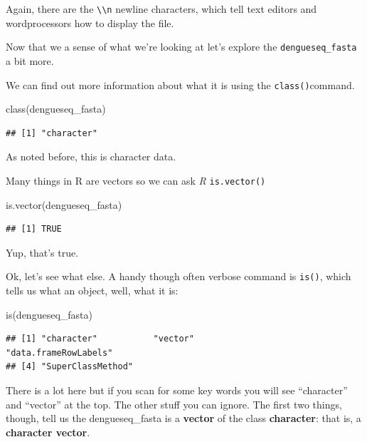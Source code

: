 \documentclass[
]{book}
\newenvironment{Shaded}{\begin{snugshade}}{\end{snugshade}}
\newcommand{\FunctionTok}[1]{\textcolor[rgb]{0.00,0.00,0.00}{#1}}
\newcommand{\NormalTok}[1]{#1}
\begin{document}
Again, there are the \texttt{\textbackslash{}\textbackslash{}n} newline characters, which tell text editors and wordprocessors how to display the file.

Now that we a sense of what we're looking at let's explore the \texttt{dengueseq\_fasta} a bit more.

We can find out more information about what it is using the \texttt{class()}command.

\begin{Shaded}
\begin{Highlighting}[]
\FunctionTok{class}\NormalTok{(dengueseq\_fasta)}
\end{Highlighting}
\end{Shaded}

\begin{verbatim}
## [1] "character"
\end{verbatim}

As noted before, this is character data.

Many things in R are vectors so we can ask \emph{R }\texttt{is.vector()}

\begin{Shaded}
\begin{Highlighting}[]
\FunctionTok{is.vector}\NormalTok{(dengueseq\_fasta)}
\end{Highlighting}
\end{Shaded}

\begin{verbatim}
## [1] TRUE
\end{verbatim}

Yup, that's true.

Ok, let's see what else. A handy though often verbose command is \texttt{is()}, which tells us what an object, well, what it is:

\begin{Shaded}
\begin{Highlighting}[]
\FunctionTok{is}\NormalTok{(dengueseq\_fasta)}
\end{Highlighting}
\end{Shaded}

\begin{verbatim}
## [1] "character"           "vector"              "data.frameRowLabels"
## [4] "SuperClassMethod"
\end{verbatim}

There is a lot here but if you scan for some key words you will see ``character'' and ``vector'' at the top. The other stuff you can ignore. The first two things, though, tell us the dengueseq\_fasta is a \textbf{vector} of the class \textbf{character}: that is, a \textbf{character vector}.
\end{document}
